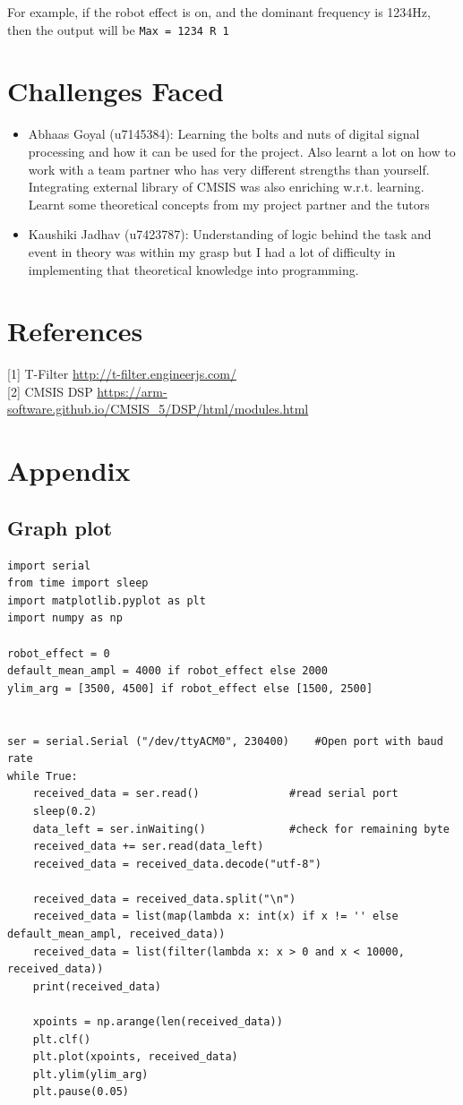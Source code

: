 \documentclass[11pt]{article}
\begin{document}
For example, if the robot effect is on, and the dominant frequency is 1234Hz, then the output will be \texttt{Max = 1234   R 1}
\section{Challenges Faced}
\label{sec:orge173432}
\begin{itemize}
\item Abhaas Goyal (u7145384): Learning the bolts and nuts of digital signal processing and how it can be used for the project. Also learnt a lot on how to work with a team partner who has very different strengths than yourself. Integrating external library of CMSIS was also enriching w.r.t. learning. Learnt some theoretical concepts from my project partner and the tutors

\item Kaushiki Jadhav (u7423787): Understanding of logic behind the task and event in theory was within my grasp but I had a lot of difficulty in implementing that theoretical knowledge into programming.
\end{itemize}

\section{References}
\label{sec:orgc9acf03}
[1] T-Filter \url{http://t-filter.engineerjs.com/} \\

[2] CMSIS DSP \url{https://arm-software.github.io/CMSIS\_5/DSP/html/modules.html}
\section{Appendix}
\label{sec:org135c0cf}
\subsection{Graph plot}
\label{sec:org48160dc}

\begin{verbatim}
import serial
from time import sleep
import matplotlib.pyplot as plt
import numpy as np

robot_effect = 0
default_mean_ampl = 4000 if robot_effect else 2000
ylim_arg = [3500, 4500] if robot_effect else [1500, 2500]


ser = serial.Serial ("/dev/ttyACM0", 230400)    #Open port with baud rate
while True:
    received_data = ser.read()              #read serial port
    sleep(0.2)
    data_left = ser.inWaiting()             #check for remaining byte
    received_data += ser.read(data_left)
    received_data = received_data.decode("utf-8")

    received_data = received_data.split("\n")
    received_data = list(map(lambda x: int(x) if x != '' else default_mean_ampl, received_data))
    received_data = list(filter(lambda x: x > 0 and x < 10000, received_data))
    print(received_data)

    xpoints = np.arange(len(received_data))
    plt.clf()
    plt.plot(xpoints, received_data)
    plt.ylim(ylim_arg)
    plt.pause(0.05)
\end{verbatim}
\end{document}
